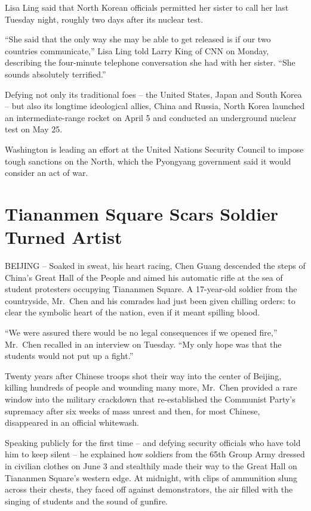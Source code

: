 \documentclass[12pt,a4paper,onecolumn]{article}
\begin{document}
Lisa Ling said that North Korean officials permitted her sister to call her last Tuesday night,
roughly two days after its nuclear test.

``She said that the only way she may be able to get released is if our two countries communicate,''
Lisa Ling told Larry King of CNN on Monday, describing the four-minute telephone conversation she
had with her sister. ``She sounds absolutely terrified.''

Defying not only its traditional foes -- the United States, Japan and South Korea -- but also its longtime ideological allies, China and Russia, North Korea launched an intermediate-range rocket on April 5 and conducted an underground nuclear test on May 25.

Washington is leading an effort at the United Nations Security Council to impose tough sanctions on the North, which the Pyongyang government said it would consider an act of war.

\section{Tiananmen Square Scars Soldier Turned Artist}

BEIJING -- Soaked in sweat, his heart racing, Chen Guang descended the steps of China's Great Hall
of the People and aimed his automatic rifle at the sea of student protesters occupying Tiananmen
Square. A 17-year-old soldier from the countryside, Mr.~Chen and his comrades had just been given
chilling orders: to clear the symbolic heart of the nation, even if it meant spilling blood.

``We were assured there would be no legal consequences if we opened fire,'' Mr.~Chen recalled in an
interview on Tuesday. ``My only hope was that the students would not put up a fight.''

Twenty years after Chinese troops shot their way into the center of Beijing, killing hundreds of
people and wounding many more, Mr.~Chen provided a rare window into the military crackdown that
re-established the Communist Party's supremacy after six weeks of mass unrest and then, for most
Chinese, disappeared in an official whitewash.

Speaking publicly for the first time -- and defying security officials who have told him to keep
silent -- he explained how soldiers from the 65th Group Army dressed in civilian clothes on June 3
and stealthily made their way to the Great Hall on Tiananmen Square's western edge. At midnight,
with clips of ammunition slung across their chests, they faced off against demonstrators, the air
filled with the singing of students and the sound of gunfire.
\end{document}
